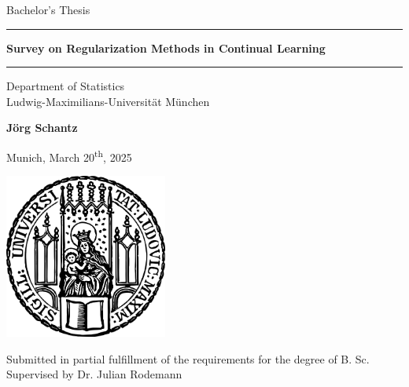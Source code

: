 \documentclass[12pt]{article}
\newcommand{\mytitle}{Survey on Regularization Methods in Continual Learning}
\newcommand{\myname}{Jörg Schantz}
\newcommand{\mysupervisor}{Dr. Julian Rodemann}
\begin{document}
	
	
	\begin{titlepage}
		\begin{center}
			
			\LARGE
			Bachelor's Thesis
			
			\vspace{0.5cm}
			
			\rule{\textwidth}{1.5pt}
			\LARGE
			\textbf{\mytitle}
			\rule{\textwidth}{1.5pt}
			
			\vspace{0.5cm}
			
			\large
			Department of Statistics \\
			Ludwig-Maximilians-Universität München 
			
			\vfill
			
			\Large
			\textbf{\myname}
			
			\vfill
			
			\large
			Munich, March 20\textsuperscript{th}, 2025
			
			\vfill
			
			\includegraphics[width = 0.4\textwidth]{img/sigillum.png}
			
			\vfill
			
			\normalsize
			Submitted in partial fulfillment of the requirements for the degree of B. Sc.
			\\
			
			Supervised by \mysupervisor
			
		\end{center}
	\end{titlepage}
	
	
	\newpage
	
\end{document}
